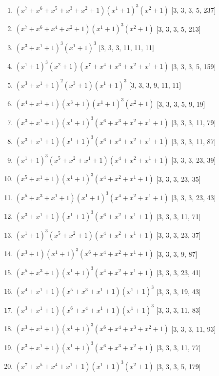 \documentclass[10pt,twocolumn]{article}
\begin{document}
\begin{enumerate}
\item $(x^{7} + x^{6} + x^{5} + x^{3} + x^{2} + 1)(x^{1} + 1)^{3}(x^{2} + 1)$  [3, 3, 3, 5, 237]
\item $(x^{7} + x^{6} + x^{4} + x^{2} + 1)(x^{1} + 1)^{3}(x^{2} + 1)$  [3, 3, 3, 5, 213]
\item $(x^{3} + x^{1} + 1)^{3}(x^{1} + 1)^{3}$  [3, 3, 3, 11, 11, 11]
\item $(x^{1} + 1)^{3}(x^{2} + 1)(x^{7} + x^{4} + x^{3} + x^{2} + x^{1} + 1)$  [3, 3, 3, 5, 159]
\item $(x^{3} + x^{1} + 1)^{2}(x^{3} + 1)(x^{1} + 1)^{3}$  [3, 3, 3, 9, 11, 11]
\item $(x^{4} + x^{1} + 1)(x^{3} + 1)(x^{1} + 1)^{3}(x^{2} + 1)$  [3, 3, 3, 5, 9, 19]
\item $(x^{3} + x^{1} + 1)(x^{1} + 1)^{3}(x^{6} + x^{3} + x^{2} + x^{1} + 1)$  [3, 3, 3, 11, 79]
\item $(x^{3} + x^{1} + 1)(x^{1} + 1)^{3}(x^{6} + x^{4} + x^{2} + x^{1} + 1)$  [3, 3, 3, 11, 87]
\item $(x^{1} + 1)^{3}(x^{5} + x^{2} + x^{1} + 1)(x^{4} + x^{2} + x^{1} + 1)$  [3, 3, 3, 23, 39]
\item $(x^{5} + x^{1} + 1)(x^{1} + 1)^{3}(x^{4} + x^{2} + x^{1} + 1)$  [3, 3, 3, 23, 35]
\item $(x^{5} + x^{3} + x^{1} + 1)(x^{1} + 1)^{3}(x^{4} + x^{2} + x^{1} + 1)$  [3, 3, 3, 23, 43]
\item $(x^{3} + x^{1} + 1)(x^{1} + 1)^{3}(x^{6} + x^{2} + x^{1} + 1)$  [3, 3, 3, 11, 71]
\item $(x^{1} + 1)^{3}(x^{5} + x^{2} + 1)(x^{4} + x^{2} + x^{1} + 1)$  [3, 3, 3, 23, 37]
\item $(x^{3} + 1)(x^{1} + 1)^{3}(x^{6} + x^{4} + x^{2} + x^{1} + 1)$  [3, 3, 3, 9, 87]
\item $(x^{5} + x^{3} + 1)(x^{1} + 1)^{3}(x^{4} + x^{2} + x^{1} + 1)$  [3, 3, 3, 23, 41]
\item $(x^{4} + x^{1} + 1)(x^{5} + x^{3} + x^{1} + 1)(x^{1} + 1)^{3}$  [3, 3, 3, 19, 43]
\item $(x^{3} + x^{1} + 1)(x^{6} + x^{4} + x^{1} + 1)(x^{1} + 1)^{3}$  [3, 3, 3, 11, 83]
\item $(x^{3} + x^{1} + 1)(x^{1} + 1)^{3}(x^{6} + x^{4} + x^{3} + x^{2} + 1)$  [3, 3, 3, 11, 93]
\item $(x^{3} + x^{1} + 1)(x^{1} + 1)^{3}(x^{6} + x^{3} + x^{2} + 1)$  [3, 3, 3, 11, 77]
\item $(x^{7} + x^{5} + x^{4} + x^{1} + 1)(x^{1} + 1)^{3}(x^{2} + 1)$  [3, 3, 3, 5, 179]

\end{enumerate}
\end{document}
